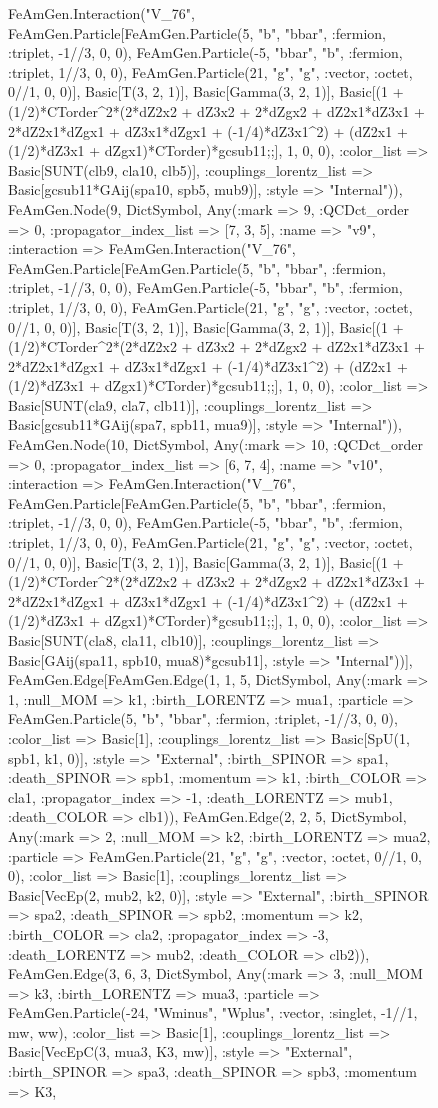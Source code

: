 \documentclass{revtex4}
\begin{document}
\begin{figure}[!htb]
\begin{center}
{FeAmGen.Interaction("V_76", FeAmGen.Particle[FeAmGen.Particle(5, "b", "bbar", :fermion, :triplet, -1//3, 0, 0), FeAmGen.Particle(-5, "bbar", "b", :fermion, :triplet, 1//3, 0, 0), FeAmGen.Particle(21, "g", "g", :vector, :octet, 0//1, 0, 0)], Basic[T(3, 2, 1)], Basic[Gamma(3, 2, 1)], Basic[(1 + (1/2)*CTorder^2*(2*dZ2x2 + dZ3x2 + 2*dZgx2 + dZ2x1*dZ3x1 + 2*dZ2x1*dZgx1 + dZ3x1*dZgx1 + (-1/4)*dZ3x1^2) + (dZ2x1 + (1/2)*dZ3x1 + dZgx1)*CTorder)*gcsub11;;], 1, 0, 0), :color_list => Basic[SUNT(clb9, cla10, clb5)], :couplings_lorentz_list => Basic[gcsub11*GAij(spa10, spb5, mub9)], :style => "Internal")), FeAmGen.Node(9, Dict{Symbol, Any}(:mark => 9, :QCDct_order => 0, :propagator_index_list => [7, 3, 5], :name => "v9", :interaction => FeAmGen.Interaction("V_76", FeAmGen.Particle[FeAmGen.Particle(5, "b", "bbar", :fermion, :triplet, -1//3, 0, 0), FeAmGen.Particle(-5, "bbar", "b", :fermion, :triplet, 1//3, 0, 0), FeAmGen.Particle(21, "g", "g", :vector, :octet, 0//1, 0, 0)], Basic[T(3, 2, 1)], Basic[Gamma(3, 2, 1)], Basic[(1 + (1/2)*CTorder^2*(2*dZ2x2 + dZ3x2 + 2*dZgx2 + dZ2x1*dZ3x1 + 2*dZ2x1*dZgx1 + dZ3x1*dZgx1 + (-1/4)*dZ3x1^2) + (dZ2x1 + (1/2)*dZ3x1 + dZgx1)*CTorder)*gcsub11;;], 1, 0, 0), :color_list => Basic[SUNT(cla9, cla7, clb11)], :couplings_lorentz_list => Basic[gcsub11*GAij(spa7, spb11, mua9)], :style => "Internal")), FeAmGen.Node(10, Dict{Symbol, Any}(:mark => 10, :QCDct_order => 0, :propagator_index_list => [6, 7, 4], :name => "v10", :interaction => FeAmGen.Interaction("V_76", FeAmGen.Particle[FeAmGen.Particle(5, "b", "bbar", :fermion, :triplet, -1//3, 0, 0), FeAmGen.Particle(-5, "bbar", "b", :fermion, :triplet, 1//3, 0, 0), FeAmGen.Particle(21, "g", "g", :vector, :octet, 0//1, 0, 0)], Basic[T(3, 2, 1)], Basic[Gamma(3, 2, 1)], Basic[(1 + (1/2)*CTorder^2*(2*dZ2x2 + dZ3x2 + 2*dZgx2 + dZ2x1*dZ3x1 + 2*dZ2x1*dZgx1 + dZ3x1*dZgx1 + (-1/4)*dZ3x1^2) + (dZ2x1 + (1/2)*dZ3x1 + dZgx1)*CTorder)*gcsub11;;], 1, 0, 0), :color_list => Basic[SUNT(cla8, cla11, clb10)], :couplings_lorentz_list => Basic[GAij(spa11, spb10, mua8)*gcsub11], :style => "Internal"))], FeAmGen.Edge[FeAmGen.Edge(1, 1, 5, Dict{Symbol, Any}(:mark => 1, :null_MOM => k1, :birth_LORENTZ => mua1, :particle => FeAmGen.Particle(5, "b", "bbar", :fermion, :triplet, -1//3, 0, 0), :color_list => Basic[1], :couplings_lorentz_list => Basic[SpU(1, spb1, k1, 0)], :style => "External", :birth_SPINOR => spa1, :death_SPINOR => spb1, :momentum => k1, :birth_COLOR => cla1, :propagator_index => -1, :death_LORENTZ => mub1, :death_COLOR => clb1)), FeAmGen.Edge(2, 2, 5, Dict{Symbol, Any}(:mark => 2, :null_MOM => k2, :birth_LORENTZ => mua2, :particle => FeAmGen.Particle(21, "g", "g", :vector, :octet, 0//1, 0, 0), :color_list => Basic[1], :couplings_lorentz_list => Basic[VecEp(2, mub2, k2, 0)], :style => "External", :birth_SPINOR => spa2, :death_SPINOR => spb2, :momentum => k2, :birth_COLOR => cla2, :propagator_index => -3, :death_LORENTZ => mub2, :death_COLOR => clb2)), FeAmGen.Edge(3, 6, 3, Dict{Symbol, Any}(:mark => 3, :null_MOM => k3, :birth_LORENTZ => mua3, :particle => FeAmGen.Particle(-24, "Wminus", "Wplus", :vector, :singlet, -1//1, mw, ww), :color_list => Basic[1], :couplings_lorentz_list => Basic[VecEpC(3, mua3, K3, mw)], :style => "External", :birth_SPINOR => spa3, :death_SPINOR => spb3, :momentum => K3, }
\end{center}
\end{figure}
\end{document}
